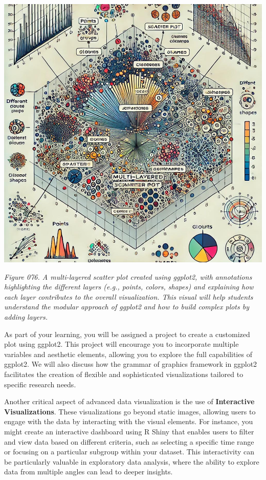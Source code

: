 \documentclass[
]{book}
\begin{document}
\includegraphics[width=1\linewidth,height=\textheight,keepaspectratio]{images/fig076.jpg}

\emph{Figure 076. A multi-layered scatter plot created using ggplot2, with annotations highlighting the different layers (e.g., points, colors, shapes) and explaining how each layer contributes to the overall visualization. This visual will help students understand the modular approach of ggplot2 and how to build complex plots by adding layers.}

As part of your learning, you will be assigned a project to create a customized plot using ggplot2. This project will encourage you to incorporate multiple variables and aesthetic elements, allowing you to explore the full capabilities of ggplot2. We will also discuss how the grammar of graphics framework in ggplot2 facilitates the creation of flexible and sophisticated visualizations tailored to specific research needs.

Another critical aspect of advanced data visualization is the use of \textbf{Interactive Visualizations}. These visualizations go beyond static images, allowing users to engage with the data by interacting with the visual elements. For instance, you might create an interactive dashboard using R Shiny that enables users to filter and view data based on different criteria, such as selecting a specific time range or focusing on a particular subgroup within your dataset. This interactivity can be particularly valuable in exploratory data analysis, where the ability to explore data from multiple angles can lead to deeper insights.
\end{document}
